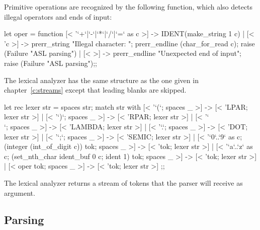 Primitive operations are recognized by the following function, which
also detects illegal operators and ends of input:
\begin{caml_example}
let oper = function
  [< '`+`|`-`|`*`|`/`|`=` as c >] -> IDENT(make_string 1 c)
| [< 'c >] -> prerr_string "Illegal character: ";
              prerr_endline (char_for_read c);
              raise (Failure "ASL parsing")
| [< >] -> prerr_endline "Unexpected end of input";
           raise (Failure "ASL parsing");;
\end{caml_example}
The lexical analyzer has the same structure as the one given in
chapter~\ref{c:streams} except that leading blanks are skipped.
\begin{caml_example}
let rec lexer str = spaces str;
match str with
  [< '`(`; spaces _ >]  -> [< 'LPAR; lexer str >]
| [< '`)`; spaces _ >]  -> [< 'RPAR; lexer str >]
| [< '`\\`; spaces _ >] -> [< 'LAMBDA; lexer str >]
| [< '`.`; spaces _ >]  -> [< 'DOT; lexer str >]
| [< '`;`; spaces _ >]  -> [< 'SEMIC; lexer str >]
| [< '`0`..`9` as c;
     (integer (int_of_digit c)) tok;
      spaces _ >]       -> [< 'tok; lexer str >]
| [< '`a`..`z` as c;
     (set_nth_char ident_buf 0 c; ident 1) tok;
     spaces _ >]        -> [< 'tok; lexer str >]
| [< oper tok; spaces _ >] -> [< 'tok; lexer str >]
;;
\end{caml_example}
The lexical analyzer returns a stream of tokens that the parser will
receive as argument.

\subsection{Parsing}

